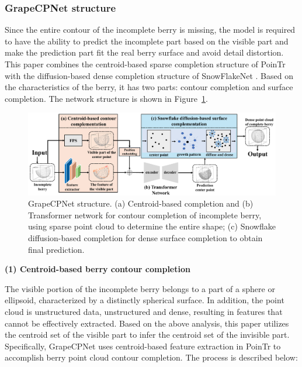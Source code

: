 \documentclass[12pt]{article}
\begin{document}
\subsubsection{GrapeCPNet structure}

Since the entire contour of the incomplete berry is missing, the model is required to have the ability to predict the incomplete part based on the visible part and make the prediction part fit the real berry surface and avoid detail distortion. 
This paper combines the centroid-based sparse completion structure of PoinTr \citep{yu_pointr_2021} with the diffusion-based dense completion structure of SnowFlakeNet \citep{xiang_snowflakenet_2021}. 
Based on the characteristics of the berry, it has two parts: contour completion and surface completion. The network structure is shown in Figure~\ref{fig:raw5}.

\begin{figure}[hbt!]
    \centering
    \includegraphics[width=1\textwidth]{figures/Figure10.pdf}
    \caption{GrapeCPNet structure. (a) Centroid-based completion and (b) Transformer network for contour completion of incomplete berry, using sparse point cloud to determine the entire shape; (c) Snowflake diffusion-based completion for dense surface completion to obtain final prediction.}
    \label{fig:raw5}
\end{figure}

{\raggedright\textbf{(1) Centroid-based berry contour completion}}

The visible portion of the incomplete berry belongs to a part of a sphere or ellipsoid, characterized by a distinctly spherical surface. 
In addition, the point cloud is unstructured data, unstructured and dense, resulting in features that cannot be effectively extracted. 
Based on the above analysis, this paper utilizes the centroid set of the visible part to infer the centroid set of the invisible part. 
Specifically, GrapeCPNet uses centroid-based feature extraction in PoinTr \citep{yu_pointr_2021} to accomplish berry point cloud contour completion. The process is described below: 
\end{document}

